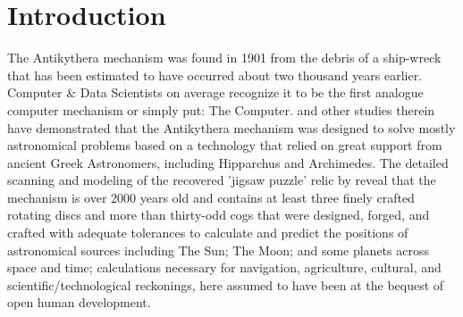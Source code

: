 \documentclass[final,5p,times,twocolumn,authoryear]{elsarticle}
\begin{document}


    

\section{Introduction}
\label{sec:intro}
%
 The Antikythera mechanism was found in 1901 from the debris of a ship-wreck that has been estimated to have occurred about two thousand years earlier. Computer \& Data Scientists on average recognize it to be the first analogue computer mechanism or simply put: The Computer. \cite{Freeth2021} and other studies therein have demonstrated that the Antikythera mechanism was designed to solve mostly astronomical problems based on a technology that relied on great support from ancient Greek Astronomers, including Hipparchus and Archimedes. The detailed scanning and modeling of the recovered 'jigsaw puzzle' relic by \cite{Freeth2021} reveal that the mechanism is over 2000 years old and contains at least three finely crafted rotating discs and more than thirty-odd cogs that were designed, forged, and crafted with adequate tolerances to calculate and predict the positions of astronomical sources including The Sun; The Moon; and some planets across space and time; calculations necessary for navigation, agriculture, cultural, and scientific/technological reckonings, here assumed to have been at the bequest of open human development.
 
\end{document}
